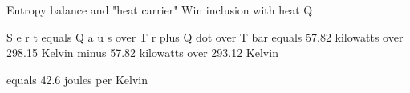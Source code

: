 Entropy balance and "heat carrier"  
Win inclusion with heat Q  

S e r t equals Q a u s over T r plus Q dot over T bar  
equals 57.82 kilowatts over 298.15 Kelvin minus 57.82 kilowatts over 293.12 Kelvin  

equals 42.6 joules per Kelvin